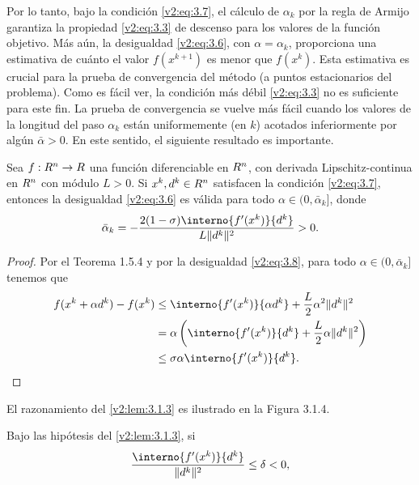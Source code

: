 Por lo tanto, bajo la condición \eqref{v2:eq:3.7}, el cálculo de $\alpha_k$ por la regla de Armijo garantiza la propiedad \eqref{v2:eq:3.3} de descenso para los valores de la función objetivo. Más aún, la desigualdad \eqref{v2:eq:3.6}, con $\alpha = \alpha_k$, proporciona una estimativa de cuánto el valor $f(x^{k+1})$ es menor que $f(x^k)$. Esta estimativa es crucial para la prueba de convergencia del método (a puntos estacionarios del problema).
Como es fácil ver, la condición más débil \eqref{v2:eq:3.3} no es suficiente para este fin. La prueba de convergencia se vuelve más fácil cuando los valores de la longitud del paso $\alpha_k$ están uniformemente (en $k$) acotados inferiormente por algún $\bar{\alpha} > 0$. En este sentido, el siguiente resultado es importante.

\begin{lemma}\label{v2:lem:3.1.3}
    Sea $f : R^n \to R$ una función diferenciable en $R^n$, con derivada Lipschitz-continua en $R^n$ con módulo $L > 0$.
    Si $x^k, d^k \in R^n$ satisfacen la condición \eqref{v2:eq:3.7}, entonces la desigualdad \eqref{v2:eq:3.6} es válida para todo $\alpha \in (0, \bar{\alpha}_k]$, donde
    \begin{equation}
        \bar{\alpha}_k = -\frac{2(1 - \sigma)\interno{f'(x^k)}{d^k}}{L\|d^k\|^2} > 0.
        \label{v2:eq:3.8}
    \end{equation}
\end{lemma}

\begin{proof}
    Por el Teorema 1.5.4 y por la desigualdad \eqref{v2:eq:3.8}, para todo $\alpha \in (0, \bar{\alpha}_k]$ tenemos que
    \begin{align*}
        f(x^k + \alpha d^k) - f(x^k) &\le \interno{f'(x^k)}{\alpha d^k} + \frac{L}{2} \alpha^2 \|d^k\|^2 \\
        &= \alpha \left( \interno{f'(x^k)}{d^k} + \frac{L}{2} \alpha \|d^k\|^2 \right) \\
        &\le \sigma \alpha \interno{f'(x^k)}{d^k}.
    \end{align*}
\end{proof}

El razonamiento del \cref{v2:lem:3.1.3} es ilustrado en la Figura 3.1.4.

Bajo las hipótesis del \cref{v2:lem:3.1.3}, si
\begin{equation}
    \frac{\interno{f'(x^k)}{d^k}}{\|d^k\|^2} \le \delta < 0,
    \label{v2:eq:3.9}
\end{equation}

